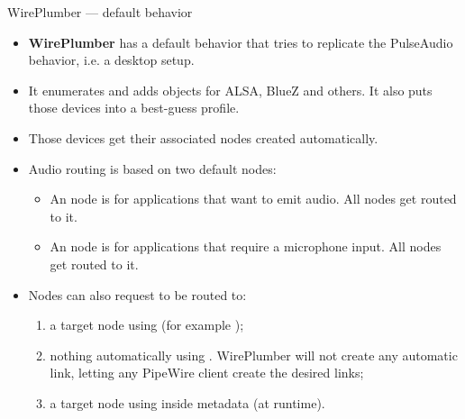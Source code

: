 \begin{frame}{WirePlumber — default behavior}
  \begin{itemize}

  \item \textbf{WirePlumber} has a default behavior that tries to
    replicate the PulseAudio behavior, i.e. a desktop setup.

  \item It enumerates and adds  objects for ALSA, BlueZ
    and others. It also puts those devices into a best-guess profile.

  \item Those devices get their associated nodes created automatically.

  \item Audio routing is based on two default nodes:

    \begin{itemize}
    \item An  node is for applications that want to
      emit audio. All  nodes get routed to it.
    \item An  node is for applications that require a
      microphone input. All  nodes get routed to it.
    \end{itemize}

  \item Nodes can also request to be routed to:

    \begin{enumerate}
    \item a target node using  (for example
      );
    \item nothing automatically using .
      WirePlumber will not create any automatic link, letting any
      PipeWire client create the desired links;
    \item a target node using  inside 
      metadata (at runtime).
    \end{enumerate}

  \end{itemize}
\end{frame}



